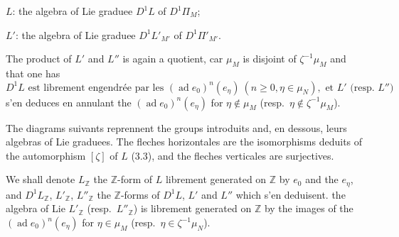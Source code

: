 \documentclass[11pt,a4paper]{article}
\theoremstyle{plain}
\theoremstyle{definition}
\DeclareMathOperator{\ad}{ad}
\newcommand{\Z}{\mathbb{Z}}
\begin{document}
$L$: the algebra of Lie graduee $D^1L$ of $D^1\Pi_M$;

$L'$: the algebra of Lie graduee $D^1L'_{M'}$ of $D^1\Pi'_{M'}$.

The product of $L'$ and $L''$ is again a quotient, car $\mu_M$ is disjoint of $\zeta^{-1}\mu_M$ and that one has
\begin{equation}\label{eq:4.1.1}
D^1L \text{ est librement engendr\'ee par les } (\ad e_0)^n(e_\eta) \ (n \geq 0, \eta \in \mu_N), \text{ et } L' \text{ (resp.~}L''\text{)}
\end{equation}
s'en deduces en annulant the $(\ad e_0)^n(e_\eta)$ for $\eta \notin \mu_M$ (resp.~$\eta \notin \zeta^{-1}\mu_M$).

The diagrams suivants reprennent the groups introduits and, en dessous, leurs algebras of Lie graduees. The fleches horizontales are the isomorphisms deduits of the automorphism $[\zeta]$ of $L$ (3.3), and the fleches verticales are surjectives.

\begin{center}
\end{center}

\begin{center}
\end{center}

We shall denote $L_\Z$ the $\Z$-form of $L$ librement generated on $\Z$ by $e_0$ and the $e_\eta$, and $D^1L_\Z$, $L'_\Z$, $L''_\Z$ the $\Z$-forms of $D^1L$, $L'$ and $L''$ which s'en deduisent. the algebra of Lie $L'_\Z$ (resp.~$L''_\Z$) is librement generated on $\Z$ by the images of the $(\ad e_0)^n(e_\eta)$ for $\eta \in \mu_M$ (resp.~$\eta \in \zeta^{-1}\mu_N$).
\end{document}

